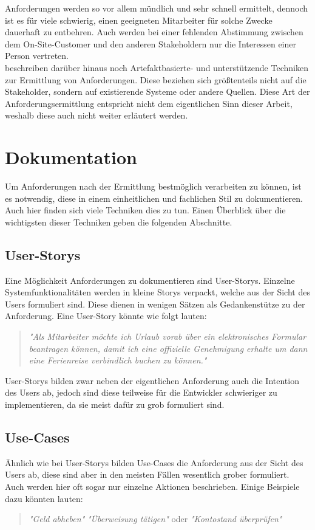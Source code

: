 Anforderungen werden so vor allem mündlich und sehr schnell ermittelt, dennoch ist es für viele schwierig, einen geeigneten Mitarbeiter für solche Zwecke dauerhaft zu entbehren. Auch werden bei einer fehlenden Abstimmung zwischen dem On-Site-Customer und den anderen Stakeholdern nur die Interessen einer Person vertreten.\\[1em]

\cite{Rupp2} beschreiben darüber hinaus noch Artefaktbasierte- und unterstützende Techniken zur Ermittlung von Anforderungen. Diese beziehen sich größtenteils nicht auf die Stakeholder, sondern auf existierende Systeme oder andere Quellen. Diese Art der Anforderungsermittlung entspricht nicht dem eigentlichen Sinn dieser Arbeit, weshalb diese auch nicht weiter erläutert werden.

\section{Dokumentation}
\label{subsec:dokumentation}
Um Anforderungen nach der Ermittlung bestmöglich verarbeiten zu können, ist es notwendig, diese in einem einheitlichen und fachlichen Stil zu dokumentieren. Auch hier finden sich viele Techniken dies zu tun. Einen Überblick über die wichtigsten dieser Techniken geben die folgenden Abschnitte.

\subsection{User-Storys}
Eine Möglichkeit Anforderungen zu dokumentieren sind User-Storys. Einzelne Systemfunktionalitäten werden in kleine Storys verpackt, welche aus der Sicht des Users formuliert sind. Diese dienen in wenigen Sätzen als Gedankenstütze zu der Anforderung. Eine User-Story könnte wie folgt lauten:

\begin{quote}
\textit{"Als Mitarbeiter möchte ich Urlaub vorab über ein elektronisches Formular beantragen können, damit ich eine offizielle Genehmigung erhalte um dann eine Ferienreise verbindlich buchen zu können."}
\end{quote}

User-Storys bilden zwar neben der eigentlichen Anforderung auch die Intention des Users ab, jedoch sind diese teilweise für die Entwickler schwieriger zu implementieren, da sie meist dafür zu grob formuliert sind.

\subsection{Use-Cases}
Ähnlich wie bei User-Storys bilden Use-Cases die Anforderung aus der Sicht des Users ab, diese sind aber in den meisten Fällen wesentlich grober formuliert. Auch werden hier oft sogar nur einzelne Aktionen beschrieben. Einige Beispiele dazu könnten lauten:
\begin{quote}
\textit{"Geld abheben"}
\textit{"Überweisung tätigen"} oder
\textit{"Kontostand überprüfen"}
\end{quote}

